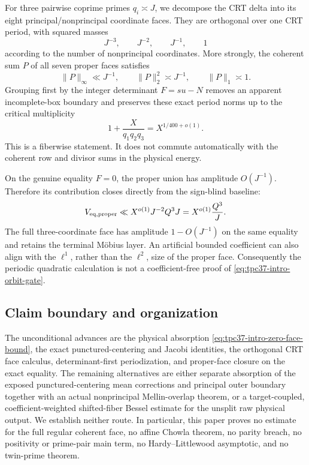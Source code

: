 For three pairwise coprime primes $q_i\asymp J$, we decompose the CRT
delta into its eight principal/nonprincipal coordinate faces.  They are
orthogonal over one CRT period, with squared masses
\begin{equation}
 J^{-3},\qquad J^{-2},\qquad J^{-1},\qquad 1
 \label{eq:tpc37-intro-face-scales}
\end{equation}
according to the number of nonprincipal coordinates.  More strongly,
the coherent sum $P$ of all seven proper faces satisfies
\begin{equation}
 \|P\|_\infty\ll J^{-1},\qquad
 \|P\|_2^2\asymp J^{-1},\qquad
 \|P\|_1\asymp1.
 \label{eq:tpc37-intro-proper-norms}
\end{equation}
Grouping first by the integer determinant $F=su-N$ removes an apparent
incomplete-box boundary and preserves these exact period norms up to the
critical multiplicity
\begin{equation}
 1+\frac X{q_1q_2q_3}
 =X^{1/400+o(1)}.
 \label{eq:tpc37-intro-critical-periods}
\end{equation}
This is a fiberwise statement.  It does not commute automatically with
the coherent row and divisor sums in the physical energy.

On the genuine equality $F=0$, the proper union has amplitude
$O(J^{-1})$.  Therefore its contribution closes directly from the
sign-blind baseline:
\begin{equation}
 V_{{\rm eq},{\rm proper}}
 \ll X^{o(1)}J^{-2}Q^3J
 =X^{o(1)}\frac{Q^3}{J}.
 \label{eq:tpc37-intro-proper-equality-closure}
\end{equation}
The full three-coordinate face has amplitude $1-O(J^{-1})$ on the same
equality and retains the terminal M\"obius layer.  An artificial bounded
coefficient can also align with the $\ell^1$, rather than the
$\ell^2$, size of the proper face.  Consequently the periodic quadratic
calculation is not a coefficient-free proof of
\eqref{eq:tpc37-intro-orbit-gate}.

\subsection{Claim boundary and organization}

The unconditional advances are the physical absorption
\eqref{eq:tpc37-intro-zero-face-bound}, the exact punctured-centering and
Jacobi identities, the orthogonal CRT face calculus, determinant-first
periodization, and proper-face closure on the exact equality.  The
remaining alternatives are either separate absorption of the exposed
punctured-centering mean corrections and principal outer boundary
together with an actual nonprincipal Mellin-overlap theorem, or a
target-coupled, coefficient-weighted shifted-fiber Bessel estimate for
the unsplit raw physical output.  We establish neither route.
In particular, this paper proves no estimate for the full
regular coherent face, no affine Chowla theorem, no parity breach, no
positivity or prime-pair main term, no Hardy--Littlewood asymptotic, and
no twin-prime theorem.

